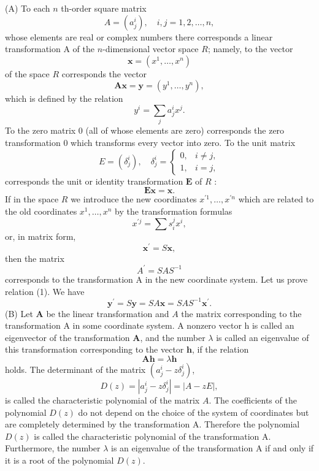 \documentclass[10pt,a5paper]{book}
\theoremstyle{plain}
\theoremstyle{definition}
\theoremstyle{remark}
\begin{document}
(A) To each $n$ th-order square matrix
\[
A=\left(a_{j}^{i}\right), \quad i, j=1,2, \ldots, n,
\]
whose elements are real or complex numbers there corresponds a linear transformation A of the $n$-dimensional vector space $R$; namely, to the vector
\[
\mathbf{x}=\left(x^{1}, \ldots, x^{n}\right)
\]
of the space $R$ corresponds the vector
\[
\mathbf{A} \mathbf{x}=\mathbf{y}=\left(y^{1}, \ldots, y^{n}\right),
\]
which is defined by the relation
\[
y^{i}=\sum_{j} a_{j}^{i} x^{j} .
\]
To the zero matrix 0 (all of whose elements are zero) corresponds the zero transformation 0 which transforms every vector into zero. To the unit matrix
\[
E=\left(\delta_{j}^{i}\right), \quad \delta_{j}^{i}= \begin{cases}0, & i \neq j, \\ 1, & i=j,\end{cases}
\]
corresponds the unit or identity transformation $\mathbf{E}$ of $R$ :
\[
\mathbf{E x}=\mathbf{x} .
\]
If in the space $R$ we introduce the new coordinates $x^{\prime 1}, \ldots, x^{\prime n}$ which are related to the old coordinates $x^{1}, \ldots, x^{n}$ by the transformation formulas
\[
x^{\prime j}=\sum s_{i}^{j} x^{i},
\]
or, in matrix form,
\[
\mathbf{x}^{\prime}=S \mathbf{x},
\]
then the matrix
\begin{equation*}
A^{\prime}=S A S^{-1} \tag{1}
\end{equation*}
corresponds to the transformation A in the new coordinate system. Let us prove relation (1). We have
\[
\mathbf{y}^{\prime}=S \mathbf{y}=S A \mathbf{x}=S A S^{-1} \mathbf{x}^{\prime} .
\]
(B) Let $\mathbf{A}$ be the linear transformation and $A$ the matrix corresponding to the transformation A in some coordinate system. A nonzero vector h is called an eigenvector of the transformation $\mathbf{A}$, and the number $\lambda$ is called an eigenvalue of this transformation corresponding to the vector $\mathbf{h}$, if the relation
\begin{equation*}
\mathbf{A h}=\lambda \mathbf{h} \tag{2}
\end{equation*}
holds. The determinant of the matrix $\left(a_{j}^{i}-z \delta_{j}^{i}\right)$,
\[
D(z)=\left|a_{j}^{i}-z \delta_{j}^{i}\right|=|A-z E|,
\]
is called the characteristic polynomial of the matrix $A$. The coefficients of the polynomial $D(z)$ do not depend on the choice of the system of coordinates but are completely determined by the transformation A. Therefore the polynomial $D(z)$ is called the characteristic polynomial of the transformation A. Furthermore, the number $\lambda$ is an eigenvalue of the transformation A if and only if it is a root of the polynomial $D(z)$.
\end{document}
